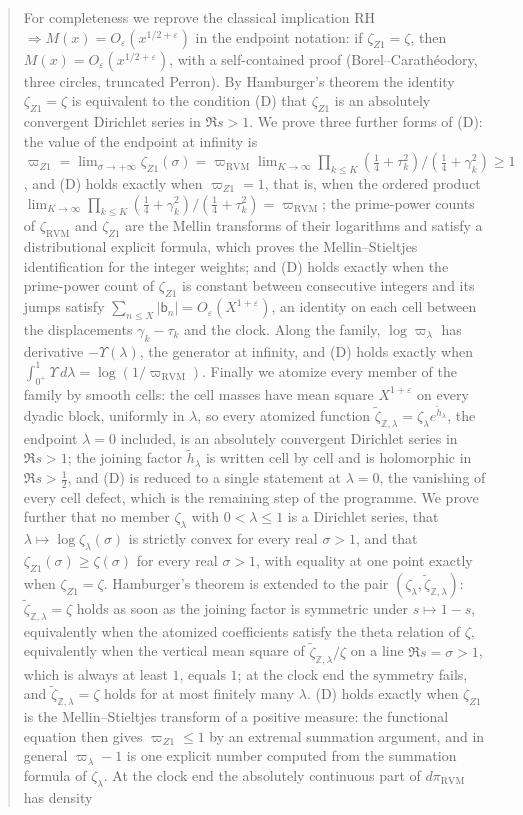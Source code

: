 \documentclass[11pt,reqno]{amsart}
\numberwithin{equation}{section}
\theoremstyle{plain}
\theoremstyle{definition}
\theoremstyle{remark}
\newcommand{\Z}{\mathbb Z}
\newcommand{\eps}{\varepsilon}
\newcommand{\RVM}{\mathrm{RVM}}
\begin{document}
\begin{abstract}
For completeness we reprove the classical implication RH $\Rightarrow M(x)=O_\eps(x^{1/2+\eps})$ in the endpoint notation: if $\zeta_{Z1}=\zeta$, then $M(x)=O_\eps(x^{1/2+\eps})$, with a self-contained proof (Borel--Carath\'eodory, three circles, truncated Perron).  By Hamburger's theorem the identity $\zeta_{Z1}=\zeta$ is equivalent to the condition (D) that $\zeta_{Z1}$ is an absolutely convergent Dirichlet series in $\Re s>1$.  We prove three further forms of (D): the value of the endpoint at infinity is $\varpi_{Z1}=\lim_{\sigma\to+\infty}\zeta_{Z1}(\sigma)=\varpi_{\RVM}\lim_{K\to\infty}\prod_{k\le K}(\frac14+\tau_k^2)/(\frac14+\gamma_k^2)\ge1$, and (D) holds exactly when $\varpi_{Z1}=1$, that is, when the ordered product $\lim_{K\to\infty}\prod_{k\le K}(\frac14+\gamma_k^2)/(\frac14+\tau_k^2)=\varpi_{\RVM}$; the prime-power counts of $\zeta_{\RVM}$ and $\zeta_{Z1}$ are the Mellin transforms of their logarithms and satisfy a distributional explicit formula, which proves the Mellin--Stieltjes identification for the integer weights; and (D) holds exactly when the prime-power count of $\zeta_{Z1}$ is constant between consecutive integers and its jumps satisfy $\sum_{n\le X}|\mathsf b_n|=O_\eps(X^{1+\eps})$, an identity on each cell between the displacements $\gamma_k-\tau_k$ and the clock.  Along the family, $\log\varpi_\lambda$ has derivative $-\Upsilon(\lambda)$, the generator at infinity, and (D) holds exactly when $\int_{0^+}^1\Upsilon\,d\lambda=\log(1/\varpi_{\RVM})$.  Finally we atomize every member of the family by smooth cells: the cell masses have mean square $X^{1+\eps}$ on every dyadic block, uniformly in $\lambda$, so every atomized function $\tilde\zeta_{\Z,\lambda}=\zeta_\lambda e^{\tilde h_\lambda}$, the endpoint $\lambda=0$ included, is an absolutely convergent Dirichlet series in $\Re s>1$; the joining factor $\tilde h_\lambda$ is written cell by cell and is holomorphic in $\Re s>\frac12$, and (D) is reduced to a single statement at $\lambda=0$, the vanishing of every cell defect, which is the remaining step of the programme.  We prove further that no member $\zeta_\lambda$ with $0<\lambda\le1$ is a Dirichlet series, that $\lambda\mapsto\log\zeta_\lambda(\sigma)$ is strictly convex for every real $\sigma>1$, and that $\zeta_{Z1}(\sigma)\ge\zeta(\sigma)$ for every real $\sigma>1$, with equality at one point exactly when $\zeta_{Z1}=\zeta$.  Hamburger's theorem is extended to the pair $(\zeta_\lambda,\tilde\zeta_{\Z,\lambda})$: $\tilde\zeta_{\Z,\lambda}=\zeta$ holds as soon as the joining factor is symmetric under $s\mapsto1-s$, equivalently when the atomized coefficients satisfy the theta relation of $\zeta$, equivalently when the vertical mean square of $\tilde\zeta_{\Z,\lambda}/\zeta$ on a line $\Re s=\sigma>1$, which is always at least $1$, equals $1$; at the clock end the symmetry fails, and $\tilde\zeta_{\Z,\lambda}=\zeta$ holds for at most finitely many $\lambda$.  (D) holds exactly when $\zeta_{Z1}$ is the Mellin--Stieltjes transform of a positive measure: the functional equation then gives $\varpi_{Z1}\le1$ by an extremal summation argument, and in general $\varpi_\lambda-1$ is one explicit number computed from the summation formula of $\zeta_\lambda$.  At the clock end the absolutely continuous part of $d\pi_{\RVM}$ has density 
\end{abstract}
\end{document}
